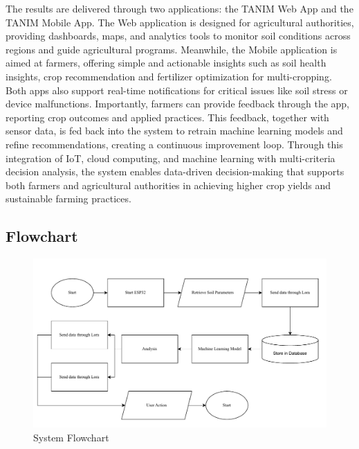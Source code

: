 {	The results are delivered through two applications: the TANIM Web App and the TANIM Mobile App. The Web application is designed for agricultural authorities, providing dashboards, maps, and analytics tools to monitor soil conditions across regions and guide agricultural programs. Meanwhile, the Mobile application is aimed at farmers, offering simple and actionable insights such as soil health insights, crop recommendation and fertilizer optimization for multi-cropping. Both apps also support real-time notifications for critical issues like soil stress or device malfunctions. Importantly, farmers can provide feedback through the app, reporting crop outcomes and applied practices. This feedback, together with sensor data, is fed back into the system to retrain machine learning models and refine recommendations, creating a continuous improvement loop. Through this integration of IoT, cloud computing, and machine learning with multi-criteria decision analysis, the system enables data-driven decision-making that supports both farmers and agricultural authorities in achieving higher crop yields and sustainable farming practices.
	
	\subsection{Flowchart}
	
	\begin{figure}[H]
		\centering
		\caption{System Flowchart}
		\label{fig:SystemFlowchart}
		\includegraphics[width=1\textwidth]{figures/SystemFlowchart.pdf}
	\end{figure}
	
}
